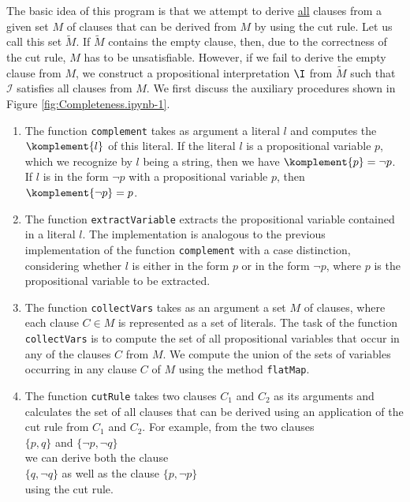 The basic idea
of this program is that we attempt to derive \underline{all} clauses from a given set $M$ of clauses
that can be derived from $M$ by using the cut rule.  Let us call this set $\widetilde{M}$.  If $\widetilde{M}$ contains the empty clause,
then, due to the correctness of the cut rule, $M$ has to be unsatisfiable. However, if we fail to derive the empty clause from $M$,
we construct a propositional interpretation
$\I$ from $\widetilde{M}$ such that $\mathcal{I}$ satisfies all clauses from $M$.
We first discuss the auxiliary procedures shown in Figure \ref{fig:Completeness.ipynb-1}.
\begin{enumerate}
\item The function \texttt{complement} takes as argument a literal $l$ and computes the
       $\komplement{l}$ of this literal.
      If the literal $l$ is a propositional variable $p$, which we recognize by $l$ being a string,
      then we have $\komplement{p} = \neg p$.
      If $l$ is in the form $\neg p$ with a propositional variable $p$, then $\komplement{\neg p} =
      p$.
\item The function \texttt{extractVariable} extracts the propositional variable contained in a literal $l$.
      The implementation is analogous to the previous implementation of the function 
      \texttt{complement} with a case distinction, considering whether $l$ is either in the form
      $p$ or in the form $\neg p$, where $p$ is the propositional variable to be extracted.
\item The function \texttt{collectVars} takes as an argument a set $M$ of clauses, where each
      clause \mbox{$C \!\in\! M$} is represented as a set of literals. The task of the
      function \texttt{collectVars} is to compute the set of all propositional variables
      that occur in any of the clauses $C$ from $M$. We compute the union of the sets of variables occurring
      in any clause $C$ of $M$ using the method \texttt{flatMap}.
\item The function \texttt{cutRule} takes two clauses $C_1$ and $C_2$ as its arguments and calculates
      the set of all clauses that can be derived using an application of the cut rule from $C_1$ and $C_2$.
      For example, from the two clauses
      \\[0.2cm]
      \hspace*{1.3cm}
      $\{ p, q \}$ \quad and \quad $\{ \neg p, \neg q \}$ 
      \\[0.2cm]
      we can derive both the clause
      \\[0.2cm]
      \hspace*{1.3cm}
      $\{q, \neg q\}$ \quad as well as the clause \quad $\{p, \neg p \}$
      \\[0.2cm]
      using the cut rule.
\end{enumerate}

